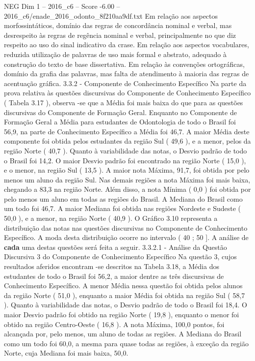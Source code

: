 \begin{textsample}{NEG Dim 1 – 2016\_c6 – Score -6.00 – 2016\_c6/enade\_2016\_odonto\_8f210aa9df.txt}
Em relação aos aspectos morfossintáticos, domínio das regras de concordância nominal e verbal, mas desrespeito às regras de regência nominal e verbal, principalmente no que diz respeito ao uso do sinal indicativo da crase.
Em relação aos aspectos vocabulares, reduzida utilização de palavras de uso mais formal e abstrato, adequado à construção do texto de base dissertativa.
Em relação às convenções ortográficas, domínio da grafia das palavras, mas falta de atendimento à maioria das regras de acentuação gráfica. 3.3.2 - Componente de Conhecimento Específico Na parte da prova relativa às questões discursivas do Componente de Conhecimento Específico ( Tabela 3.17 ), observa -se que a Média foi mais baixa do que para as questões discursivas do Componente de Formação Geral.
Enquanto no Componente de Formação Geral a Média para estudantes de Odontologia de todo o Brasil foi 56,9, na parte de Conhecimento Específico a Média foi 46,7.
A maior Média deste componente foi obtida pelos estudantes da região Sul ( 49,6 ), e a menor, pelos da região Norte ( 40,7 ).
Quanto à variabilidade das notas, o Desvio padrão de todo o Brasil foi 14,2.
O maior Desvio padrão foi encontrado na região Norte ( 15,0 ), e o menor, na região Sul ( 13,5 ).
A maior nota Máxima, 91,7, foi obtida por pelo menos um aluno da região Sul.
Nas demais regiões a nota Máxima foi mais baixa, chegando a 83,3 na região Norte.
Além disso, a nota Mínima ( 0,0 ) foi obtida por pelo menos um aluno em todas as regiões do Brasil.
A Mediana do Brasil como um todo foi 46,7.
A maior Mediana foi obtida nas regiões Nordeste e Sudeste ( 50,0 ), e a menor, na região Norte ( 40,9 ).
O Gráfico 3.10 representa a distribuição das notas nas questões discursivas no Componente de Conhecimento Específico.
A moda desta distribuição ocorre no intervalo ( 40 ; 50 ].
A análise de \textbf{cada} uma destas questões será feita a seguir. 3.3.2.1 - Análise da Questão Discursiva 3 do Componente de Conhecimento Específico Na questão 3, cujos resultados aferidos encontram -se descritos na Tabela 3.18, a Média dos estudantes de todo o Brasil foi 56,2, a maior dentre as três discursivas de Conhecimento Específico.
A menor Média nessa questão foi obtida pelos alunos da região Norte ( 51,0 ), enquanto a maior Média foi obtida na região Sul ( 58,7 ).
Quanto à variabilidade das notas, o Desvio padrão de todo o Brasil foi 18,4.
O maior Desvio padrão foi obtido na região Norte ( 19,8 ), enquanto o menor foi obtido na região Centro-Oeste ( 16,8 ).
A nota Máxima, 100,0 pontos, foi alcançada por, pelo menos, um aluno de todas as regiões.
A Mediana do Brasil como um todo foi 60,0, a mesma para quase todas as regiões, à exceção da região Norte, cuja Mediana foi mais baixa, 50,0.

\end{textsample}
